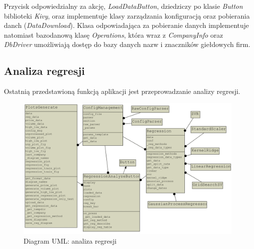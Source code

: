 Przycisk odpowiedzialny za akcję, \textit{LoadDataButton}, dziedziczy po klasie \textit{Button} biblioteki \textit{Kivy}, oraz implementuje klasy zarządzania konfiguracją oraz pobierania danch (\textit{DataDownload}).
Klasa odpowiadająca za pobieranie danych implementuje natomiast bazodanową klasę \textit{Operations}, która wraz z \textit{CompanyInfo} oraz \textit{DbDriver} umożliwiają dostęp do bazy danych nazw i znaczników giełdowych firm.\\

\subsection{Analiza regresji}
Ostatnią przedstawioną funkcją aplikacji jest przeprowadzanie analizy regresji.\\
\begin{figure}[h!]
\centering
\includegraphics[width=150mm,heigh=100mm]{pictures/uml_regression.png}
\caption{Diagram UML: analiza regresji}
\label{fig:Diagram UML: analiza regresji}
\end{figure}

